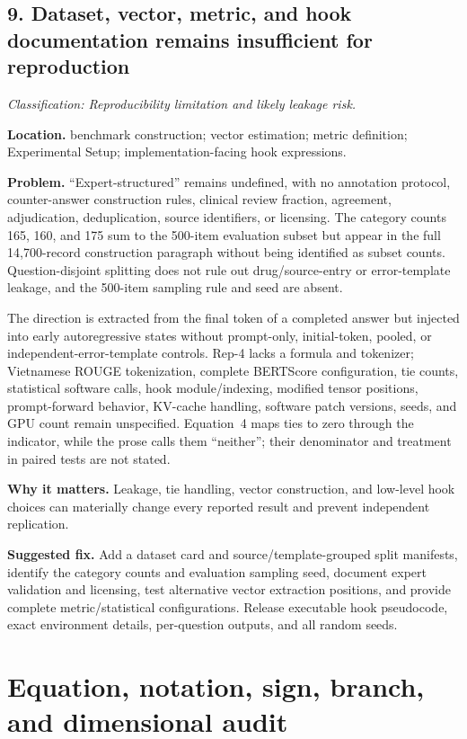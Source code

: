 \documentclass[11pt]{article}
\newcommand{\findinglabel}[1]{\textbf{#1}}
\newcommand{\classification}[1]{\textit{Classification: #1.}}
\begin{document}
\subsection*{9. Dataset, vector, metric, and hook documentation remains insufficient for reproduction}

\classification{Reproducibility limitation and likely leakage risk}

\findinglabel{Location.} benchmark construction; vector estimation; metric definition; Experimental Setup; implementation-facing hook expressions.

\findinglabel{Problem.} ``Expert-structured'' remains undefined, with no annotation protocol, counter-answer construction rules, clinical review fraction, agreement, adjudication, deduplication, source identifiers, or licensing.  The category counts 165, 160, and 175 sum to the 500-item evaluation subset but appear in the full 14,700-record construction paragraph without being identified as subset counts.  Question-disjoint splitting does not rule out drug/source-entry or error-template leakage, and the 500-item sampling rule and seed are absent.

The direction is extracted from the final token of a completed answer but injected into early autoregressive states without prompt-only, initial-token, pooled, or independent-error-template controls.  Rep-4 lacks a formula and tokenizer; Vietnamese ROUGE tokenization, complete BERTScore configuration, tie counts, statistical software calls, hook module/indexing, modified tensor positions, prompt-forward behavior, KV-cache handling, software patch versions, seeds, and GPU count remain unspecified.  Equation~4 maps ties to zero through the indicator, while the prose calls them ``neither''; their denominator and treatment in paired tests are not stated.

\findinglabel{Why it matters.} Leakage, tie handling, vector construction, and low-level hook choices can materially change every reported result and prevent independent replication.

\findinglabel{Suggested fix.} Add a dataset card and source/template-grouped split manifests, identify the category counts and evaluation sampling seed, document expert validation and licensing, test alternative vector extraction positions, and provide complete metric/statistical configurations.  Release executable hook pseudocode, exact environment details, per-question outputs, and all random seeds.

\section*{Equation, notation, sign, branch, and dimensional audit}
\end{document}
